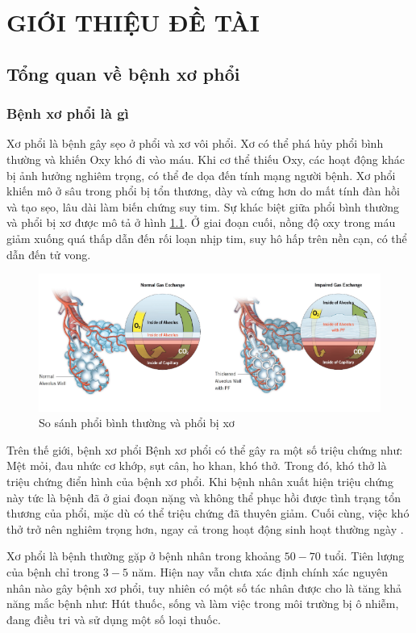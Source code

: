 \chapter{GIỚI THIỆU ĐỀ TÀI}
\section{Tổng quan về bệnh xơ phổi}
\subsection{Bệnh xơ phổi là gì}
Xơ phổi là bệnh gây sẹo ở phổi và xơ vôi phổi. Xơ có thể phá hủy phổi bình thường và khiến Oxy khó đi vào máu. Khi cơ thể thiếu Oxy, các hoạt động khác bị ảnh hưởng nghiêm trọng, có thể đe dọa đến tính mạng người bệnh. Xơ phổi khiến mô ở sâu trong phổi bị tổn thương, dày và cứng hơn do mất tính đàn hồi và tạo sẹo, lâu dài làm biến chứng suy tim. Sự khác biệt giữa phổi bình thường và phổi bị xơ được mô tả ở hình \ref{fig:phoi}. Ở giai đoạn cuối, nồng độ oxy trong máu giảm xuống quá thấp dẫn đến rối loạn nhịp tim, suy hô hấp trên nền cạn, có thể dẫn đến tử vong. \par
\begin{figure}[ht!]
\centerline{\includegraphics[scale=0.7]{images/pf1.PNG}}
\caption{So sánh phổi bình thường và phổi bị xơ}
\label{fig:phoi}
\end{figure}
Trên thế giới, bệnh xơ phổi 
Bệnh xơ phổi có thể gây ra một số triệu chứng như: Mệt mỏi, đau nhức cơ khớp, sụt cân, ho khan, khó thở. Trong đó, khó thở là triệu chứng điển hình của bệnh xơ phổi. Khi bệnh nhân xuất hiện triệu chứng này tức là bệnh đã ở giai đoạn nặng và không thể phục hồi được tình trạng tổn thương của phổi, mặc dù có thể triệu chứng đã thuyên giảm. Cuối cùng, việc khó thở trở nên nghiêm trọng hơn, ngay cả trong hoạt động sinh hoạt thường ngày \cite{PF:web}.\par
Xơ phổi là bệnh thường gặp ở bệnh nhân trong khoảng $50-70$ tuổi. Tiên lượng của bệnh chỉ trong $3-5$ năm. Hiện nay vẫn chưa xác định chính xác nguyên nhân nào gây bệnh xơ phổi, tuy nhiên có một số tác nhân được cho là tăng khả năng mắc bệnh như: Hút thuốc, sống và làm việc trong môi trường bị ô nhiễm, đang điều tri và sử dụng một số loại thuốc. \par
